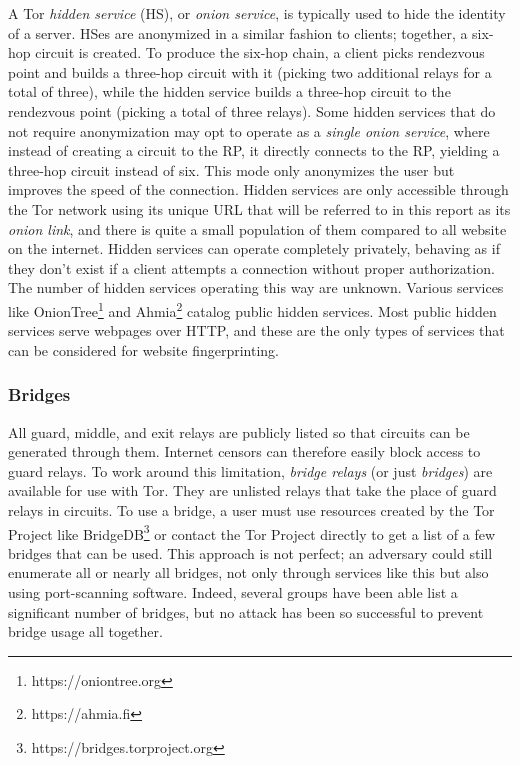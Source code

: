 \documentclass[11pt]{article}
\begin{document}
A Tor \textit{hidden service} (HS), or \textit{onion service}, is typically used to hide the identity of a server. HSes are anonymized in a similar fashion to clients; together, a six-hop circuit is created. To produce the six-hop chain, a client picks rendezvous point and builds a three-hop circuit with it (picking two additional relays for a total of three), while the hidden service builds a three-hop circuit to the rendezvous point (picking a total of three relays). Some hidden services that do not require anonymization may opt to operate as a \textit{single onion service}, where instead of creating a circuit to the RP, it directly connects to the RP, yielding a three-hop circuit instead of six. This mode only anonymizes the user but improves the speed of the connection. Hidden services are only accessible through the Tor network using its unique URL that will be referred to in this report as its \textit{onion link}, and there is quite a small population of them compared to all website on the internet.
Hidden services can operate completely privately, behaving as if they don't exist if a client attempts a connection without proper authorization. The number of hidden services operating this way are unknown.
Various services like OnionTree\footnote{https://oniontree.org} and Ahmia\footnote{https://ahmia.fi} catalog public hidden services. Most public hidden services serve webpages over HTTP, and these are the only types of services that can be considered for website fingerprinting.

\subsubsection{Bridges}
All guard, middle, and exit relays are publicly listed so that circuits can be generated through them. Internet censors can therefore easily block access to guard relays. To work around this limitation, \textit{bridge relays} (or just \textit{bridges}) are available for use with Tor. They are unlisted relays that take the place of guard relays in circuits. To use a bridge, a user must use resources created by the Tor Project like BridgeDB\footnote{https://bridges.torproject.org} or contact the Tor Project directly to get a list of a few bridges that can be used. This approach is not perfect; an adversary could still enumerate all or nearly all bridges, not only through services like this but also using port-scanning software. Indeed, several groups have been able list a significant number of bridges\cite{troncoso}, but no attack has been so successful to prevent bridge usage all together.
\end{document}
